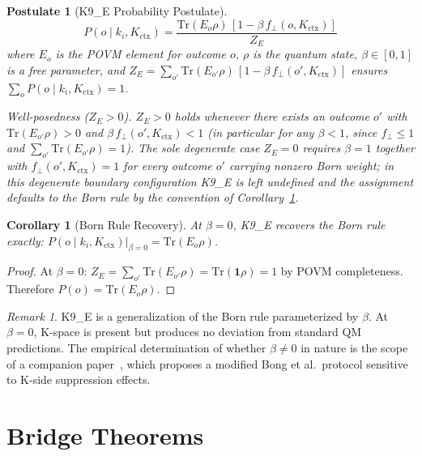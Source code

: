 \documentclass[12pt,a4paper]{article}
\theoremstyle{plain}
\newtheorem{postulate}{Postulate}[section]
\newtheorem{corollary}{Corollary}[theorem]
\theoremstyle{definition}
\theoremstyle{remark}
\newtheorem{remark}{Remark}[section]
\newcommand{\Kctx}{K_{\mathrm{ctx}}}
\newcommand{\fperp}{f_{\!\perp}}
\begin{document}
\begin{postulate}[K9\_E Probability Postulate]\label{ax:K9E}
\begin{equation}
  \boxed{P(o \mid k_i, \Kctx)
  = \frac{\mathrm{Tr}(E_o\rho)\,[1 - \beta\,\fperp(o,\Kctx)]}{Z_E}}
  \label{eq:K9E}
\end{equation}
where $E_o$ is the POVM element for outcome $o$, $\rho$ is the quantum
state, $\beta \in [0,1]$ is a free parameter, and
$Z_E = \sum_{o'} \mathrm{Tr}(E_{o'}\rho)\,[1-\beta\,\fperp(o',\Kctx)]$
ensures $\sum_o P(o\mid k_i,\Kctx) = 1$.

\smallskip
\noindent\textit{Well-posedness ($Z_E > 0$).}
$Z_E > 0$ holds whenever there exists an outcome $o'$ with
$\mathrm{Tr}(E_{o'}\rho) > 0$ and $\beta\,\fperp(o',\Kctx) < 1$
(in particular for any $\beta < 1$, since
$\fperp \le 1$ and $\sum_{o'}\mathrm{Tr}(E_{o'}\rho) = 1$).
The sole degenerate case $Z_E = 0$ requires $\beta = 1$ together with
$\fperp(o',\Kctx) = 1$ for every outcome $o'$ carrying nonzero Born weight;
in this degenerate boundary configuration K9\_E is left undefined and the
assignment defaults to the Born rule by the convention of
Corollary~\ref{cor:born}.
\end{postulate}

\begin{corollary}[Born Rule Recovery]\label{cor:born}
At $\beta = 0$, K9\_E recovers the Born rule exactly:
$P(o \mid k_i, \Kctx)\big|_{\beta=0} = \mathrm{Tr}(E_o\rho)$.
\end{corollary}

\begin{proof}
At $\beta=0$: $Z_E = \sum_{o'}\mathrm{Tr}(E_{o'}\rho) = \mathrm{Tr}(\mathbf{1}\rho)=1$
by POVM completeness. Therefore $P(o) = \mathrm{Tr}(E_o\rho)$.
\end{proof}

\begin{remark}
K9\_E is a generalization of the Born rule parameterized by $\beta$.
At $\beta=0$, K-space is present but produces no deviation from standard
QM predictions. The empirical determination of whether $\beta \neq 0$ in
nature is the scope of a companion paper~\cite{K9S12_Zenodo}, which proposes
a modified Bong et al.\ protocol sensitive to K-side suppression effects.
\end{remark}

\section{Bridge Theorems}
\label{sec:theorems}
\end{document}
